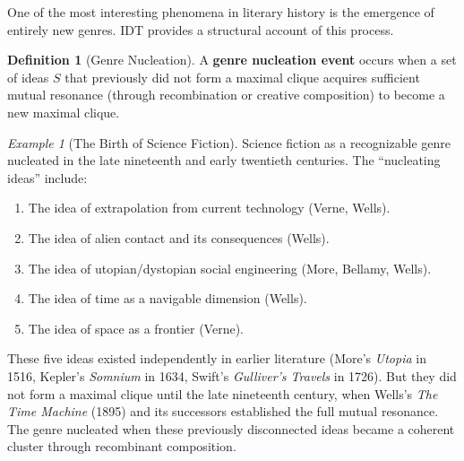 \documentclass[11pt,openany]{book}
\theoremstyle{definition}
\newtheorem{definition}[axiom]{Definition}
\theoremstyle{plain}
\theoremstyle{remark}
\newtheorem{example}[axiom]{Example}
\begin{document}
One of the most interesting phenomena in literary history is the emergence of entirely new genres. IDT provides a structural account of this process.

\begin{definition}[Genre Nucleation]
A \textbf{genre nucleation event} occurs when a set of ideas $S$ that previously did not form a maximal clique acquires sufficient mutual resonance (through recombination or creative composition) to become a new maximal clique.
\end{definition}

\begin{example}[The Birth of Science Fiction]
Science fiction as a recognizable genre nucleated in the late nineteenth and early twentieth centuries. The ``nucleating ideas'' include:
\begin{enumerate}
\item The idea of extrapolation from current technology (Verne, Wells).
\item The idea of alien contact and its consequences (Wells).
\item The idea of utopian/dystopian social engineering (More, Bellamy, Wells).
\item The idea of time as a navigable dimension (Wells).
\item The idea of space as a frontier (Verne).
\end{enumerate}

These five ideas existed independently in earlier literature (More's \textit{Utopia} in 1516, Kepler's \textit{Somnium} in 1634, Swift's \textit{Gulliver's Travels} in 1726). But they did not form a maximal clique until the late nineteenth century, when Wells's \textit{The Time Machine} (1895) and its successors established the full mutual resonance. The genre nucleated when these previously disconnected ideas became a coherent cluster through recombinant composition.
\end{example}
\end{document}
